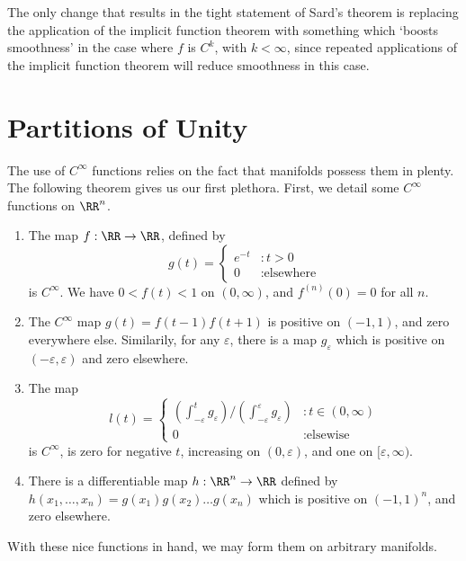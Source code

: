 \begin{remark}
    The only change that results in the tight statement of Sard's theorem is replacing the application of the implicit function theorem with something which `boosts smoothness' in the case where $f$ is $C^k$, with $k < \infty$, since repeated applications of the implicit function theorem will reduce smoothness in this case.
\end{remark}

\section{Partitions of Unity}

The use of $C^\infty$ functions relies on the fact that manifolds possess them in plenty. The following theorem gives us our first plethora. First, we detail some $C^\infty$ functions on $\RR^n$.

\begin{enumerate}
    \item The map $f:\RR \to \RR$, defined by
    \[
    g(t) =
    \begin{cases}
        e^{-t} & : t > 0\\
        0 & : \text{elsewhere}
    \end{cases}
    \]
    is $C^\infty$. We have $0 < f(t) < 1$ on $(0,\infty)$, and $f^{(n)}(0) = 0$ for all $n$.
    \item The $C^\infty$ map $g(t) = f(t-1)f(t+1)$ is positive on $(-1,1)$, and zero everywhere else. Similarily, for any $\varepsilon$, there is a map $g_\varepsilon$ which is positive on $(-\varepsilon, \varepsilon)$ and zero elsewhere.
    \item The map 
    \[ l(t) = \begin{cases}
        \left(\int_{-\varepsilon}^t g_\varepsilon \right)/\left(\int_{-\varepsilon}^\varepsilon g_\varepsilon \right) & : t \in (0, \infty) \\
        0 & : \text{elsewise}
    \end{cases} \]
    is $C^\infty$, is zero for negative $t$, increasing on $(0, \varepsilon)$, and one on $[\varepsilon, \infty)$.
    \item There is a differentiable map $h:\RR^n \to \RR$ defined by $h(x_1, \dots, x_n) = g(x_1) g(x_2) \dots g(x_n)$ which is positive on $(-1, 1)^n$, and zero elsewhere.
\end{enumerate}

With these nice functions in hand, we may form them on arbitrary manifolds.

